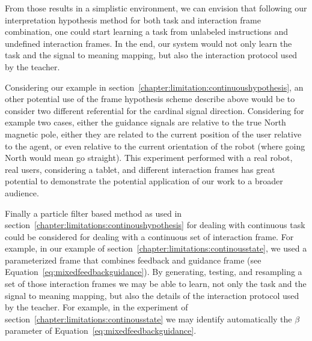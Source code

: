 From those results in a simplistic environment, we can envision that following our interpretation hypothesis method for both task and interaction frame combination, one could start learning a task from unlabeled instructions and undefined interaction frames. In the end, our system would not only learn the task and the signal to meaning mapping, but also the interaction protocol used by the teacher.

Considering our example in section~\ref{chapter:limitation:continuoushypothesis}, an other potential use of the frame hypothesis scheme describe above would be to consider two different referential for the cardinal signal direction. Considering for example two cases, either the guidance signals are relative to the true North magnetic pole, either they are related to the current position of the user relative to the agent, or even relative to the current orientation of the robot (where going North would mean go straight). This experiment performed with a real robot, real users, considering a tablet, and different interaction frames has great potential to demonstrate the potential application of our work to a broader audience.

Finally a particle filter based method as used in section~\ref{chapter:limitations:continoushypothesis} for dealing with continuous task could be considered for dealing with a continuous set of interaction frame. For example, in our example of section~\ref{chapter:limitations:continousstate}, we used a parameterized frame that combines feedback and guidance frame (see Equation~\ref{eq:mixedfeedbackguidance}). By generating, testing, and resampling a set of those interaction frames we may be able to learn, not only the task and the signal to meaning mapping, but also the details of the interaction protocol used by the teacher. For example, in the experiment of section~\ref{chapter:limitations:continousstate} we may identify automatically the $\beta$ parameter of Equation~\ref{eq:mixedfeedbackguidance}.